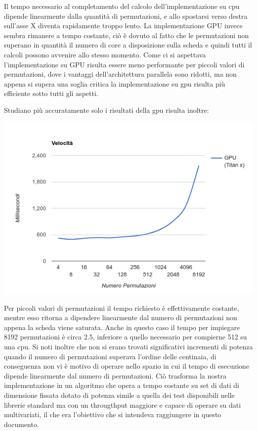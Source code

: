 Il tempo necessario al completamento del calcolo dell'implementazione su cpu dipende linearmente dalla quantità di permutazioni, e allo spostarsi verso destra sull'asse X diventa rapidamente troppo lento. La implementazione GPU invece sembra rimanere a tempo costante, ciò è dovuto al fatto che le permutazioni non superano in quantità il numero di core a disposizione sulla scheda e quindi tutti il calcoli possono avvenire allo stesso momento. 
Come ci si aspettava l'implementazione su GPU risulta essere meno performante per piccoli valori di permutazioni, dove i vantaggi dell'architettura parallela sono ridotti, ma non appena si supera una soglia critica la implementazione su gpu risulta più efficiente sotto tutti gli aspetti.

Studiano più accuratamente solo i risultati della gpu risulta inoltre:

\includegraphics[width=\linewidth]{analisi}

Per piccoli valori di permutazioni il tempo richiesto è effettivamente costante, mentre esso ritorna a dipendere linearmente dal numero di permutazioni non appena la scheda viene saturata.
Anche in questo caso il tempo per impiegare 8192 permutazioni è circa 2.5, inferiore a quello necessario per compierne 512 su una cpu. Si noti inoltre che non si erano trovati significativi incrementi di potenza quando il numero di permutazioni superava l'ordine delle centinaia, di conseguenza non vi è motivo di operare nello spazio in cui il tempo di esecuzione dipende linearmente dal numero di permutazioni. Ciò trasforma la nostra implementazione in un algoritmo che opera a tempo costante su set di dati di dimensione fissata dotato di potenza simile a quella dei test disponibili nelle librerie standard ma con un througthput maggiore e capace di operare su dati multivariati, il che era l'obiettivo che si intendeva raggiungere in questo documento.

